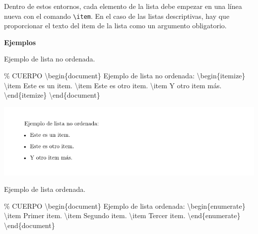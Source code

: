 \documentclass[
  a4paper,
]{scrreport}
\newenvironment{Shaded}{\begin{snugshade}}{\end{snugshade}}
\newcommand{\CommentTok}[1]{\textcolor[rgb]{0.37,0.37,0.37}{#1}}
\newcommand{\ExtensionTok}[1]{\textcolor[rgb]{0.00,0.23,0.31}{#1}}
\newcommand{\FunctionTok}[1]{\textcolor[rgb]{0.28,0.35,0.67}{#1}}
\newcommand{\KeywordTok}[1]{\textcolor[rgb]{0.00,0.23,0.31}{#1}}
\newcommand{\NormalTok}[1]{\textcolor[rgb]{0.00,0.23,0.31}{#1}}
\begin{document}
Dentro de estos entornos, cada elemento de la lista debe empezar en una
línea nueva con el comando \texttt{\textbackslash{}item}. En el caso de
las listas descriptivas, hay que proporcionar el texto del item de la
lista como un argumento obligatorio.

\textbf{Ejemplos}

Ejemplo de lista no ordenada.

\begin{Shaded}
\begin{Highlighting}[]
\CommentTok{\% CUERPO}
\KeywordTok{\textbackslash{}begin}\NormalTok{\{}\ExtensionTok{document}\NormalTok{\}}
\NormalTok{Ejemplo de lista no ordenada:}
\KeywordTok{\textbackslash{}begin}\NormalTok{\{}\ExtensionTok{itemize}\NormalTok{\}}
\FunctionTok{\textbackslash{}item}\NormalTok{ Este es un item.}
\FunctionTok{\textbackslash{}item}\NormalTok{ Este es otro item.}
\FunctionTok{\textbackslash{}item}\NormalTok{ Y otro item más.}
\KeywordTok{\textbackslash{}end}\NormalTok{\{}\ExtensionTok{itemize}\NormalTok{\}}
\KeywordTok{\textbackslash{}end}\NormalTok{\{}\ExtensionTok{document}\NormalTok{\}}
\end{Highlighting}
\end{Shaded}

\begin{tcolorbox}[enhanced jigsaw, bottomrule=.15mm, leftrule=.75mm, opacityback=0, titlerule=0mm, bottomtitle=1mm, colbacktitle=quarto-callout-note-color!10!white, arc=.35mm, toprule=.15mm, colframe=quarto-callout-note-color-frame, title={Salida}, coltitle=black, colback=white, breakable, toptitle=1mm, rightrule=.15mm, left=2mm, opacitybacktitle=0.6]

\includegraphics{./img/listas/lista-no-ordenad.png}

\end{tcolorbox}

Ejemplo de lista ordenada.

\begin{Shaded}
\begin{Highlighting}[]
\CommentTok{\% CUERPO}
\KeywordTok{\textbackslash{}begin}\NormalTok{\{}\ExtensionTok{document}\NormalTok{\}}
\NormalTok{Ejemplo de lista ordenada:}
\KeywordTok{\textbackslash{}begin}\NormalTok{\{}\ExtensionTok{enumerate}\NormalTok{\}}
\FunctionTok{\textbackslash{}item}\NormalTok{ Primer item.}
\FunctionTok{\textbackslash{}item}\NormalTok{ Segundo item.}
\FunctionTok{\textbackslash{}item}\NormalTok{ Tercer item.}
\KeywordTok{\textbackslash{}end}\NormalTok{\{}\ExtensionTok{enumerate}\NormalTok{\}}
\KeywordTok{\textbackslash{}end}\NormalTok{\{}\ExtensionTok{document}\NormalTok{\}}
\end{Highlighting}
\end{Shaded}
\end{document}
